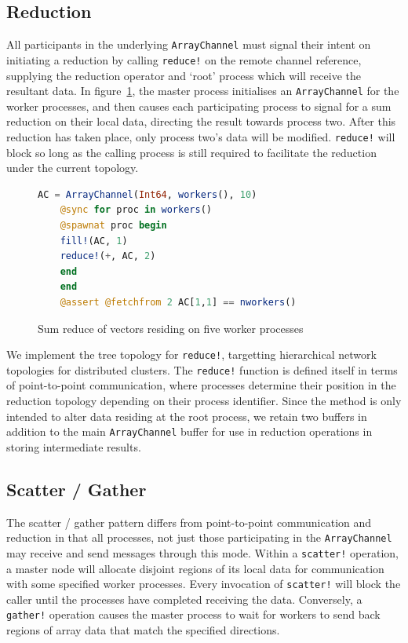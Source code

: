 \documentclass{juliacon}
\begin{document}
\subsection{Reduction}
\label{sec:reduce}

All participants in the underlying \texttt{ArrayChannel} must signal
their intent on initiating a reduction by calling \texttt{reduce!} on
the remote channel reference, supplying the reduction operator and
`root' process which will receive the resultant data. In figure~\ref{code:reduce}, the master process initialises an
\texttt{ArrayChannel} for the worker processes, and then causes each
participating process to signal for a sum reduction on their local data,
directing the result towards process two. After this reduction has taken
place, only process two's data will be modified. \texttt{reduce!} will
block so long as the calling process is still required to facilitate the
reduction under the current topology.

\begin{figure}[htb]
	\begin{lstlisting}[language=Julia]
	AC = ArrayChannel(Int64, workers(), 10)
	@sync for proc in workers()
	@spawnat proc begin
	fill!(AC, 1)
	reduce!(+, AC, 2)
	end
	end
	@assert @fetchfrom 2 AC[1,1] == nworkers()
	\end{lstlisting}
	\caption{Sum reduce of vectors residing on five worker processes}
	\label{code:reduce}
\end{figure}

We implement the tree topology for \texttt{reduce!}, targetting
hierarchical network topologies for distributed clusters. The
\texttt{reduce!} function is defined itself in terms of point-to-point
communication, where processes determine their position in the reduction
topology depending on their process identifier. Since the method is only
intended to alter data residing at the root process, we retain two
buffers in addition to the main \texttt{ArrayChannel} buffer for use in
reduction operations in storing intermediate results.

\subsection{Scatter / Gather}
\label{sec:scatter-gather}

The scatter / gather pattern differs from point-to-point communication and reduction in that all processes, not just those participating in the \texttt{ArrayChannel} may receive and send messages through this mode. Within a \texttt{scatter!} operation, a master node will allocate disjoint regions of its local data for communication with some specified worker processes. Every invocation of \texttt{scatter!} will block the caller until the processes have completed receiving the data. Conversely, a \texttt{gather!} operation causes the master process to wait for workers to send back regions of array data that match the specified directions.
\end{document}
